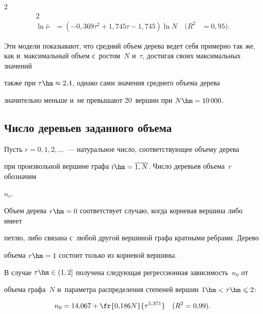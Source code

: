 \begin{multicols}{2}
\begin{alignat*}{2}
\\


\ln\bar{\nu} &= (-0{,}369 \tau^2+1{,}745 \tau-1{,}745)\ln N &\ (R^2&=0{,}95).


\end{alignat*}


Эти модели показывают, что средний объем дерева ведет себя примерно так же, как и~максимальный объем с~ростом~$N$ и~$\tau$, достигая своих максимальных значений 


также при $\tau\hm\approx 2{,}4$, однако сами значения среднего объема дерева 


значительно меньше и~не превышают 20~вершин при $N\hm=10\,000$.











\subsection{Число деревьев заданного объема}





Пусть $r=0,1,2,\ldots$~--- натуральное число, соответствующее объему дерева 


при произвольной вершине графа $i\hm=\overline{1,N}$. Число деревьев объема~$r$ обозначим 


$n_r$.


Объем дерева $r\hm=0$ соответствует случаю, когда корневая вершина либо имеет 


петлю, либо связана с~любой другой вершиной графа кратными ребрами. Дерево 


объема $r\hm=1$ состоит только из корневой вершины.





В случае $\tau\hm\in(1,2]$ получена следующая регрессионная зависимость~$n_0$ от 


объема графа~$N$ и~параметра распределения степеней вершин $1\hm<\tau\hm\leqslant 2$:


\begin{equation*}


n_0 = 14{,}067+\fr{0{,}186N}{\tau^{5,371}} \quad (R^2=0{,}99).


\end{equation*}






\end{multicols}
